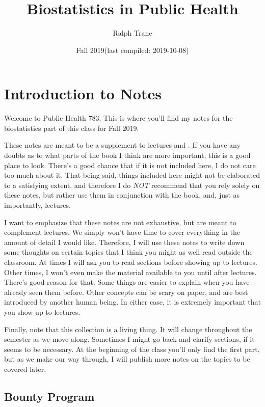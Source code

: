 \documentclass[]{book}
\title{Biostatistics in Public Health}
\author{Ralph Trane}
\date{Fall 2019(last compiled: 2019-10-08)}
\theoremstyle{definition}
\theoremstyle{definition}
\theoremstyle{definition}
\theoremstyle{remark}
\begin{document}
\maketitle

{
\setcounter{tocdepth}{1}
\tableofcontents
}
\hypertarget{introduction-to-notes}{%
\chapter{Introduction to Notes}\label{introduction-to-notes}}

\newcommand{\Var}{\text{Var}}
\newcommand{\var}{\text{var}}
\newcommand{\SD}{\text{SD}}

Welcome to Public Health 783. This is where you'll find my notes for the biostatistics part of this class for Fall 2019.

These notes are meant to be a supplement to lectures and \citet{ls}. If you have any doubts as to what parts of the book I think are more important, this is a good place to look. There's a good chance that if it is not included here, I do not care too much about it. That being said, things included here might not be elaborated to a satisfying extent, and therefore I do \emph{NOT} recommend that you rely solely on these notes, but rather use them in conjunction with the book, and, just as importantly, lectures.

I want to emphasize that these notes are not exhaustive, but are meant to complement lectures. We simply won't have time to cover everything in the amount of detail I would like. Therefore, I will use these notes to write down some thoughts on certain topics that I think you might as well read outside the classroom. At times I will ask you to read sections before showing up to lectures. Other times, I won't even make the material available to you until after lectures. There's good reason for that. Some things are easier to explain when you have already seen them before. Other concepts can be scary on paper, and are best introduced by another human being. In either case, it is extremely important that you show up to lectures.

Finally, note that this collection is a living thing. It will change throughout the semester as we move along. Sometimes I might go back and clarify sections, if it seems to be necessary. At the beginning of the class you'll only find the first part, but as we make our way through, I will publish more notes on the topics to be covered later.

\hypertarget{bounty-program}{%
\section*{Bounty Program}\label{bounty-program}}
\end{document}
